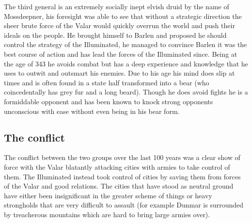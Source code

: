 \documentclass[10pt,twoside,twocolumn]{article}
\begin{document}

The third general is an extremely socially inept elvish druid by the name of Mossdeepner, his foresight was able to see that without a strategic direction the sheer brute force of the Valar would quickly overrun the world and push their ideals on the people. He brought himself to Barlen and proposed he should control the strategy of the Illuminated, he managed to convince Barlen it was the best course of action and has lead the forces of the Illuminated since. Being at the age of 343 he avoids combat but has a deep experience and knowledge that he uses to outwit and outsmart his enemies. Due to his age his mind does slip at times and is often found in a state half transformed into a bear (who coincedentally has grey fur and a long beard). Though he does avoid fights he is a formiddable opponent and has been known to knock strong opponents unconscious with ease without even being in his bear form.\\

\subsection{The conflict}
The conflict between the two groups over the last 100 years was a clear show of force with the Valar blatantly attacking cities with armies to take control of them. The Illuminated instead took control of cities by saving them from forces of the Valar and good relations. The cities that have stood as neutral ground have either been insignificant in the greater scheme of things or heavy strongholds that are very difficult to assault (for example Dunmar is surrounded by treacherous mountains which are hard to bring large armies over).\\
\end{document}
